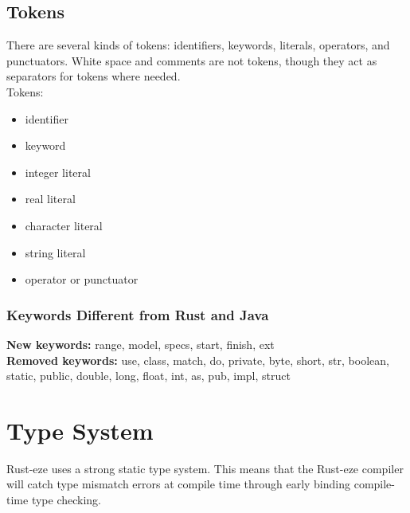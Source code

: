 \documentclass[letterpaper, 10pt, DIV=13]{scrartcl}
\numberwithin{equation}{section}
\numberwithin{figure}{section}
\numberwithin{table}{section}
\begin{document}
\subsection{Tokens}
There are several kinds of tokens: identifiers, keywords, literals, operators, 
and punctuators. White space and comments are not tokens, though they act as
separators for tokens where needed. \\
Tokens:
\begin{itemize}
    \item identifier
    \item keyword
    \item integer literal
    \item real literal
    \item character literal
    \item string literal
    \item operator or punctuator
\end{itemize}

\subsubsection{Keywords Different from Rust and Java}
\textbf{New keywords:} range, model, specs, start, finish, ext \\
\textbf{Removed keywords:} use, class, match, do, private, byte, short, str,
                           boolean, static, public, double, long, float,
                           int, as, pub, impl, struct \\

\section{Type System}
Rust-eze uses a strong static type system. This means that the Rust-eze compiler
will catch type mismatch errors at compile time through early binding compile-time
type checking.
\end{document}
